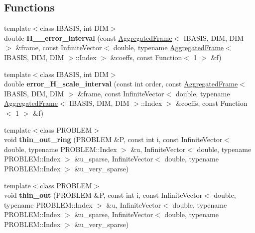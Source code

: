 \subsection*{Functions}
\begin{CompactItemize}
\item 
\hypertarget{namespaceFrameTL_5f7cd84df62cbac0d03d55a63858d138}{
{\footnotesize template$<$class IBASIS, int DIM$>$ }\\double \textbf{H\_\_\-error\_\-interval} (const \hyperlink{classFrameTL_1_1AggregatedFrame}{AggregatedFrame}$<$ IBASIS, DIM, DIM $>$ \&frame, const InfiniteVector$<$ double, typename \hyperlink{classFrameTL_1_1AggregatedFrame}{AggregatedFrame}$<$ IBASIS, DIM, DIM $>$::Index $>$ \&coeffs, const Function$<$ 1 $>$ \&f)}
\label{namespaceFrameTL_5f7cd84df62cbac0d03d55a63858d138}

\item 
\hypertarget{namespaceFrameTL_1b900f7d22f4b32129f53074030c4d85}{
{\footnotesize template$<$class IBASIS, int DIM$>$ }\\double \textbf{error\_\-H\_\-scale\_\-interval} (const int order, const \hyperlink{classFrameTL_1_1AggregatedFrame}{AggregatedFrame}$<$ IBASIS, DIM, DIM $>$ \&frame, const InfiniteVector$<$ double, typename \hyperlink{classFrameTL_1_1AggregatedFrame}{AggregatedFrame}$<$ IBASIS, DIM, DIM $>$::Index $>$ \&coeffs, const Function$<$ 1 $>$ \&f)}
\label{namespaceFrameTL_1b900f7d22f4b32129f53074030c4d85}

\item 
\hypertarget{namespaceFrameTL_2c2397a9802a34ffc082c4de792c808d}{
{\footnotesize template$<$class PROBLEM$>$ }\\void \textbf{thin\_\-out\_\-ring} (PROBLEM \&P, const int i, const InfiniteVector$<$ double, typename PROBLEM::Index $>$ \&u, InfiniteVector$<$ double, typename PROBLEM::Index $>$ \&u\_\-sparse, InfiniteVector$<$ double, typename PROBLEM::Index $>$ \&u\_\-very\_\-sparse)}
\label{namespaceFrameTL_2c2397a9802a34ffc082c4de792c808d}

\item 
\hypertarget{namespaceFrameTL_9e04ddf27423214b1a0ffa4060ce6224}{
{\footnotesize template$<$class PROBLEM$>$ }\\void \textbf{thin\_\-out} (PROBLEM \&P, const int i, const InfiniteVector$<$ double, typename PROBLEM::Index $>$ \&u, InfiniteVector$<$ double, typename PROBLEM::Index $>$ \&u\_\-sparse, InfiniteVector$<$ double, typename PROBLEM::Index $>$ \&u\_\-very\_\-sparse)}
\label{namespaceFrameTL_9e04ddf27423214b1a0ffa4060ce6224}


\end{CompactItemize}
